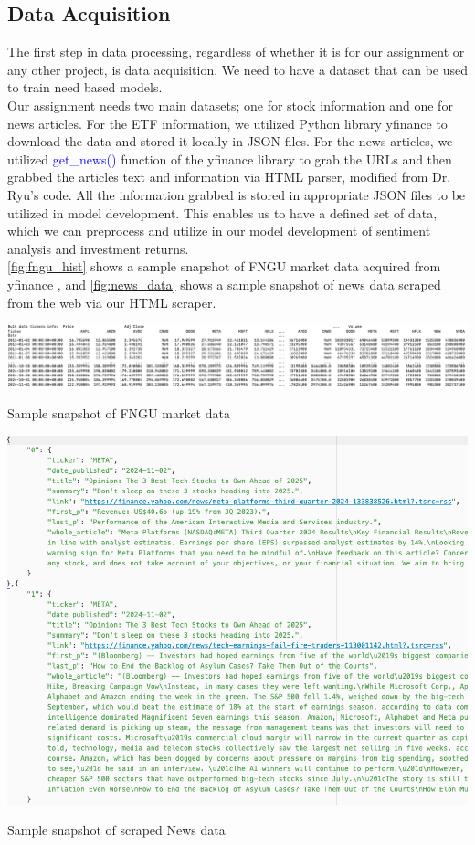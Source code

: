 \documentclass[twocolumn,12pt]{article}
\makeatletter
\newenvironment{figurehere}
  {\def\@captype{figure}}
  {}
\makeatother
\begin{document}
\begin{flushleft}
	\subsection{Data Acquisition} \label{data_acquisition}
	The first step in data processing, regardless of whether it is for our assignment or any other project, is data acquisition. We need to have a dataset that can be used to train need based models.\\
	Our assignment needs two main datasets; one for stock information and one for news articles. For the ETF information, we utilized Python library yfinance \cite{yfin} to download the data and stored it locally in JSON files. For the news articles, we utilized \textcolor{blue}{get\_news()} function of the yfinance library \cite{yfin} to grab the URLs and then grabbed the articles text and information via HTML parser, modified from Dr. Ryu's \cite{cryu} code. All the information grabbed is stored in appropriate JSON files to be utilized in model development. This enables us to have a defined set of data, which we can preprocess and utilize in our model development of sentiment analysis and investment returns.\\
	\cref{fig:fngu_hist} shows a sample snapshot of FNGU market data acquired from yfinance \cite{yfin}, and \cref{fig:news_data} shows a sample snapshot of news data scraped from the web via our HTML scraper.
	
	\mbox{}
	\begin{figurehere}
		\centering
		\includegraphics[width=\linewidth]{images/fngu_hist.png}
		\caption{Sample snapshot of FNGU market data}
		\label{fig:fngu_hist}
	\end{figurehere}
	
	\mbox{}
	\begin{figurehere}
		\centering
		\includegraphics[width=0.6\linewidth]{images/news_data.png}
		\caption{Sample snapshot of scraped News data}
		\label{fig:news_data}
	\end{figurehere}
	

\end{flushleft}
\end{document}
